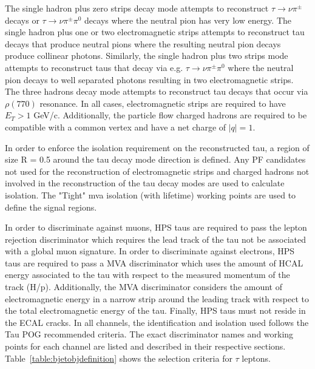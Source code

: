The single hadron plus zero strips decay mode attempts to reconstruct $\tau \to \nu\pi^{\pm}$ decays or $\tau \to \nu\pi^{\pm}\pi^{0}$ decays where the neutral pion has very low energy. The single hadron plus one or two electromagnetic strips attempts to reconstruct tau decays that produce neutral pions where the resulting neutral pion decays produce collinear photons. Similarly, the single hadron plus two strips mode attempts to reconstruct taus that decay via e.g. $\tau \to \nu\pi^{\pm}\pi^{0}$ where the neutral pion decays to well separated photons resulting in two electromagnetic strips. The three hadrons decay mode attempts to reconstruct tau decays that occur via $\rho(770)$ resonance. In all cases, electromagnetic strips are required to have $E_{T} > 1$ GeV/c. Additionally, the particle flow charged hadrons are required to be compatible with a common vertex and have a net charge of $|q|=1$.

In order to enforce the isolation requirement on the reconstructed tau, a region of size R = 0.5 around the tau decay mode direction is defined. Any PF candidates not used for the reconstruction of electromagnetic strips and charged hadrons not involved in the reconstruction of the tau decay modes are used to calculate isolation. The "Tight" mva isolation (with lifetime) working points are used to define the signal regions.

In order to discriminate against muons, HPS taus are required to pass the lepton rejection discriminator which requires the lead track of the tau not be associated with a global muon signature. In order to discriminate against electrons, HPS taus are required to pass a MVA discriminator which uses the amount of HCAL energy associated to the tau with respect to the measured momentum of the track (H/p). Additionally, the MVA discriminator considers the amount of electromagnetic energy in a narrow strip around the leading track with respect to the total electromagnetic energy of the tau. Finally, HPS taus must not reside in the ECAL cracks. In all channels, the identification and isolation used follows the Tau POG recommended criteria. The exact discriminator names and working points for each channel are listed and described in their respective sections. Table~\ref{table:bjetobjdefinition} shows the selection criteria for $\tau$ leptons.


